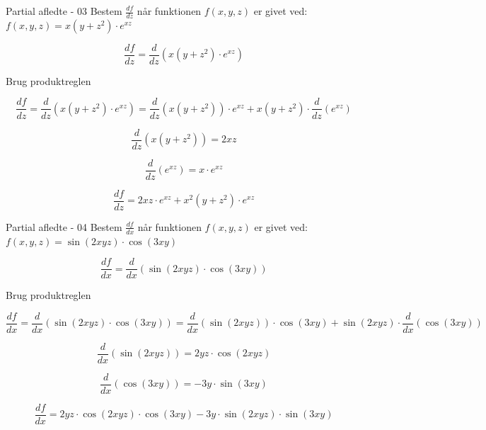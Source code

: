 \documentclass{article}
\begin{document}
\begin{exercise}{Partial afledte - 03}
Bestem $\frac{df}{dz}$ når funktionen $f(x,y,z)$ er givet ved:
$f(x,y,z) =x(y + z^2) \cdot e^{x z}$


\hint
\[
\frac{df}{dz} = \frac{d}{dz} \left( x(y + z^2) \cdot e^{x z}\right)
\]

\hint
Brug produktreglen

\hint
\[
\frac{df}{dz} = \frac{d}{dz} \left( x(y + z^2) \cdot e^{x z}\right) = \frac{d}{dz} \left(x(y + z^2) \right) \cdot e^{xz} + x(y + z^2) \cdot \frac{d}{dz}\left(e^{xz} \right)
\]

\hint
\[
\frac{d}{dz} \left(x(y + z^2)\right) = 2xz
\]

\hint
\[
\frac{d}{dz}\left( e^{xz}\right) =x \cdot e^{xz}
\]

\hint
\[
\frac{df}{dz} = 2xz \cdot e^{xz} + x^2(y + z^2) \cdot e^{xz}
\]


\end{exercise}

\begin{exercise}{Partial afledte - 04}
Bestem $\frac{df}{dx}$ når funktionen $f(x,y,z)$ er givet ved: \\
$f(x,y,z) = \sin(2xyz) \cdot \cos(3xy)$


\hint
\[
\frac{df}{dx} = \frac{d}{dx} \left( \sin(2xyz) \cdot \cos(3xy)\right)
\]

\hint
Brug produktreglen

\hint
\[
\frac{df}{dx} = \frac{d}{dx} \left( \sin(2xyz) \cdot \cos(3xy)\right) = \frac{d}{dx} \left(\sin(2xyz) \right) \cdot \cos(3xy) + \sin(2xyz) \cdot \frac{d}{dx}\left( \cos(3xy)\right)
\]

\hint
\[
\frac{d}{dx} \left(\sin(2xyz) \right) = 2yz \cdot \cos(2xyz)
\]

\hint
\[
\frac{d}{dx}\left( \cos(3xy)\right) = -3y \cdot \sin(3xy)
\]

\hint
\[
\frac{df}{dx} = 2yz \cdot \cos(2xyz) \cdot \cos(3xy) - 3y \cdot \sin(2xyz) \cdot \sin(3xy)
\]


\end{exercise}
\end{document}
